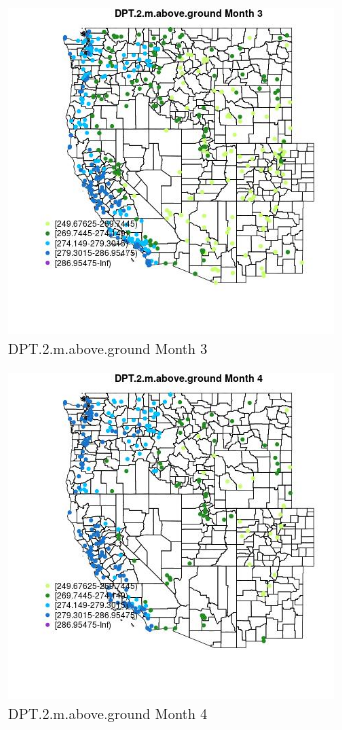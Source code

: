 \begin{figure} 
\centering  
\includegraphics[width=0.77\textwidth]{Code_Outputs/Report_ML_input_PM25_Step4_part_e_de_duplicated_aveswNAs_MapObsMo3DPT2maboveground.jpg} 
\caption{\label{fig:Report_ML_input_PM25_Step4_part_e_de_duplicated_aveswNAsMapObsMo3DPT2maboveground}DPT.2.m.above.ground Month 3} 
\end{figure} 
 

\begin{figure} 
\centering  
\includegraphics[width=0.77\textwidth]{Code_Outputs/Report_ML_input_PM25_Step4_part_e_de_duplicated_aveswNAs_MapObsMo4DPT2maboveground.jpg} 
\caption{\label{fig:Report_ML_input_PM25_Step4_part_e_de_duplicated_aveswNAsMapObsMo4DPT2maboveground}DPT.2.m.above.ground Month 4} 
\end{figure} 
 

